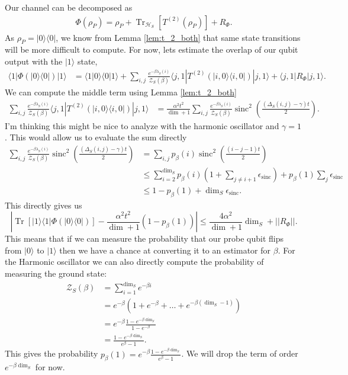 \documentclass{article}
\newcommand{\ket}[1]{|#1\rangle}
\newcommand{\bra}[1]{\langle #1|}
\newcommand{\braket}[2]{\langle #1|#2\rangle}
\newcommand{\ketbra}[2]{| #1\rangle\! \langle #2|}
\newcommand{\brackets}[1]{\left[ #1 \right]}
\newcommand{\norm}[1]{\left| \left| #1 \right| \right|}
\DeclareMathOperator{\Tr}{Tr}
\newcommand{\trace}[1]{\Tr \brackets{ #1 }}
\newcommand{\partrace}[2]{\Tr_{#1} \brackets{ #2 }}
\newcommand{\hilb}{\mathcal{H}}
\newcommand{\partfun}{\mathcal{Z}}
\DeclareMathOperator{\sinc}{sinc}
\begin{document}
Our channel can be decomposed as
\begin{align}
    \Phi(\rho_P) = \rho_P + \partrace{\hilb_S}{T^{(2)}(\rho_P)} + R_{\Phi}.
\end{align}
As $\rho_P = \ketbra{0}{0}$, we know from Lemma \ref{lem:t_2_both} that same state transitions will be more difficult to compute. For now, lets estimate the overlap of our qubit output with the $\ket{1}$ state, 
\begin{align}
    \bra{1} \Phi(\ketbra{0}{0}) \ket{1} &= \braket{1}{0} \braket{0}{1} + \sum_{i, j} \frac{e^{-\beta \lambda_S(i)}}{\partfun_S(\beta)} \bra{j, 1} T^{(2)}(\ketbra{i, 0}{i, 0}) \ket{j, 1} +  \bra{j, 1} R_{\Phi} \ket{j, 1}.
\end{align}
We can compute the middle term using Lemma \ref{lem:t_2_both}
\begin{align}
    \sum_{i, j} \frac{e^{-\beta \lambda_S(i)}}{\partfun_S(\beta)} \bra{j, 1} T^{(2)}(\ketbra{i, 0}{i, 0}) \ket{j, 1} &= \frac{\alpha^2 t^2}{\dim + 1} \sum_{i, j} \frac{e^{-\beta \lambda_S(i)}}{\partfun_S(\beta)} \sinc^2 \left( \frac{(\Delta_S(i, j) - \gamma) t}{2} \right).
\end{align}
I'm thinking this might be nice to analyze with the harmonic oscillator and $\gamma = 1$. This would allow us to evaluate the sum directly
\begin{align}
    \sum_{i, j} \frac{e^{-\beta \lambda_S(i)}}{\partfun_S(\beta)} \sinc^2 \left( \frac{(\Delta_S(i, j) - \gamma) t}{2} \right) &= \sum_{i, j} p_{\beta}(i) \sinc^2 \left( \frac{(i - j - 1) t}{2} \right) \\
    &\leq \sum_{i = 2}^{\dim_S} p_{\beta}(i)(1 + \sum_{j \neq i + 1} \epsilon_{\sinc}) + p_{\beta}(1) \sum_{j} \epsilon_{\sinc} \\
    &\leq 1 - p_{\beta}(1) + \dim_S \epsilon_{\sinc}.
\end{align}
This directly gives us
\begin{equation}
    \left|\trace{\ketbra{1}{1} \Phi(\ketbra{0}{0})} - \frac{\alpha^2 t^2}{\dim + 1}(1 - p_{\beta}(1)) \right| \leq \frac{4 \alpha^2}{\dim + 1} \dim_S + \norm{R_{\Phi}}.
\end{equation}
This means that if we can measure the probability that our probe qubit flips from $\ket{0}$ to $\ket{1}$ then we have a chance at converting it to an estimator for $\beta$. For the Harmonic oscillator we can also directly compute the probability of measuring the ground state:
\begin{align}
    \partfun_S(\beta) &= \sum_{i = 1}^{\dim_S} e^{-\beta i} \\
    &= e^{-\beta} \left( 1 + e^{-\beta} + \ldots + e^{-\beta(\dim_S - 1)}\right) \\
    &= e^{-\beta} \frac{1 - e^{-\beta \dim_S}}{1 - e^{-\beta}} \\
    &= \frac{1 - e^{-\beta \dim_S}}{e^{\beta} - 1}.
\end{align}
This gives the probability $p_{\beta}(1) = e^{-\beta} \frac{1 - e^{-\beta \dim_S}}{e^{\beta} - 1}$. We will drop the term of order $e^{-\beta \dim_S}$ for now.
\end{document}
